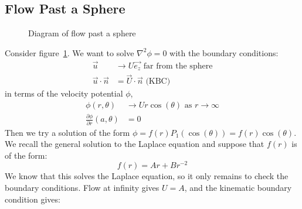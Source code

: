 \documentclass[../Main.tex]{subfiles}
\begin{document}
\subsection{Flow Past a Sphere}
\begin{figure}
    \centering
    \caption{Diagram of flow past a sphere}
    \label{figFlowSphere}
\end{figure}
Consider figure~\ref{figFlowSphere}. We want to solve $\nabla^2 \phi = 0$ with the boundary conditions:
\begin{align*}
    \vec{u} &\to U \vec{e_z} \text{ far from the sphere} \\
    \vec{u} \cdot \vec{n} &= \vec{U} \cdot \vec{n} \text{ (KBC)}
\end{align*}
in terms of the velocity potential $\phi$,
\begin{align*}
    \phi(r, \theta) &\to U r \cos(\theta) \text{ as $r\to\infty$} \\
    \frac{\partial \phi}{\partial r}(a, \theta) &= 0 
\end{align*}
Then we try a solution of the form $\phi = f(r) P_1(\cos(\theta)) = f(r) \cos(\theta)$. We recall the general solution to the Laplace equation and suppose that $f(r)$ is of the form:
\begin{equation*}
    f(r) = Ar + B r^{-2}
\end{equation*}
We know that this solves the Laplace equation, so it only remains to check the boundary conditions. Flow at infinity gives $U = A$, and the kinematic boundary condition gives:
\end{document}
